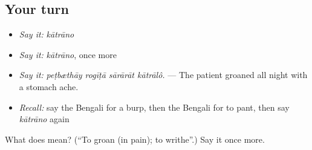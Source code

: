 \subsection*{Your turn}
\begin{itemize}
\raggedright
  \item \emph{Say it:} \emph{kātrāno}
  \item \emph{Say it:} \emph{kātrāno}, once more
  \item \emph{Say it:} \emph{peṭbæthāy rogīṭā sārārāt kātrālô.} — The patient groaned all night with a stomach ache.
  \item \emph{Recall:} say the Bengali for a burp, then the Bengali for to pant, then say \emph{kātrāno} again
\end{itemize}

\begin{tcolorbox}[breakable,colback=teal!4,colframe=teal!35!black,title={Before you move on}]
What does  mean? (\textquotedblleft{}To groan (in pain); to writhe\textquotedblright{}.) Say it once more.
\end{tcolorbox}
